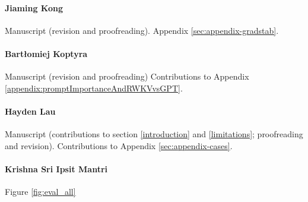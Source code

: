 \documentclass[11pt]{article}
\begin{document}
\paragraph{Jiaming Kong} Manuscript (revision and proofreading). Appendix  \ref{sec:appendix-gradstab}.

\paragraph{Bart\l{}omiej Koptyra} Manuscript (revision and proofreading) Contributions to Appendix \ref{appendix:promptImportanceAndRWKVvsGPT}.

\paragraph{Hayden Lau} Manuscript (contributions to section \ref{introduction} and \ref{limitations}; proofreading and revision). Contributions to Appendix \ref{sec:appendix-cases}.

\paragraph{Krishna Sri Ipsit Mantri} Figure \ref{fig:eval_all}


\end{document}
